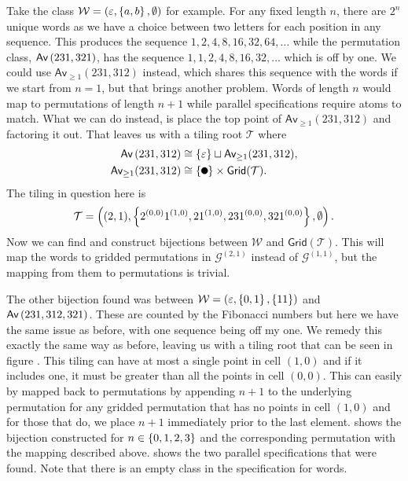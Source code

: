 Take the class $\mathcal{W} = (\varepsilon, \left\{a,b\right\}, \emptyset)$ for example. For any fixed length $n$, there are $2^n$ unique words as we have a choice between two letters for each position in any sequence. This produces the sequence $1, 2, 4, 8, 16, 32, 64, \dotsc$ while the permutation class, $\textsf{Av}\left(231,321\right)$, has the sequence $1, 1, 2, 4, 8, 16, 32, \dotsc$ which is off by one. We could use $\textsf{Av}_{\geq1}(231,312)$ instead, which shares this sequence with the words if we start from $n=1$, but that brings another problem. Words of length $n$ would map to permutations of length $n+1$ while parallel specifications require atoms to match. What we can do instead, is place the top point of $\textsf{Av}_{\geq1}(231,312)$ and factoring it out. That leaves us with a tiling root $\mathcal{T}$ where
\begin{align*}
    \Av{231,312} &\cong \set{\varepsilon} \sqcup \textsf{Av}_{\geq1}(231,312),\\
    \textsf{Av}_{\geq1}(231,312) &\cong \set{\point{0.1}}\times \textsf{Grid}(\mathcal{T}).
\end{align*}
The tiling in question here is
\[
    \mathcal{T} = \left((2,1), \left\{2^{(0,0)}1^{(1,0)}, 21^{(1,0)}, 231^{(0,0)}, 321^{(0,0)}\right\},\emptyset\right).
\]
Now we can find and construct bijections between $\mathcal{W}$ and $\textsf{Grid}(\mathcal{T})$. This will map the words to gridded permutations in $\mathcal{G}^{(2,1)}$ instead of $\mathcal{G}^{(1,1)}$, but the mapping from them to permutations is trivial.

The other bijection found was between $\mathcal{W} = (\varepsilon, \left\{0,1\right\}, \left\{11\right\})$ and $\textsf{Av}\left(231,312,321\right)$. These are counted by the Fibonacci numbers but here we have the same issue as before, with one sequence being off my one. We remedy this exactly the same way as before, leaving us with a tiling root that can be seen in figure . This tiling can have at most a single point in cell $(1,0)$ and if it includes one, it must be greater than all the points in cell $(0,0)$. This can easily by mapped back to permutations by appending $n+1$ to the underlying permutation for any gridded permutation that has no points in cell $(1,0)$ and for those that do, we place $n+1$ immediately prior to the last element.  shows the bijection constructed for $n \in \left\{0,1,2,3\right\}$ and the corresponding permutation with the mapping described above.  shows the two parallel specifications that were found. Note that there is an empty class in the specification for words.

